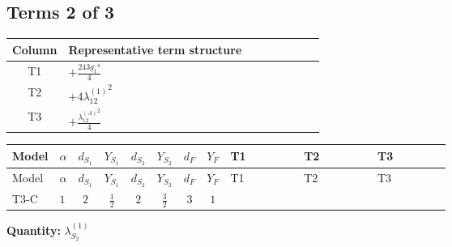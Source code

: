 \documentclass[8pt]{article}
\begin{document}
\begin{landscape}
\subsection*{Terms 2 of 3}
\begin{center}
\begin{tabular}{@{}c >{\raggedright\arraybackslash}p{0.82\linewidth}@{}}
\toprule
Column & Representative term structure \\
\midrule
T1 & \(\displaystyle +\frac{243 {g_1}^4}{4}\) \\
\midrule
T2 & \(\displaystyle +4 {\lambda_{12}^{(1)}}^2\) \\
\midrule
T3 & \(\displaystyle +\frac{{\lambda_{12}^{(A)}}^2}{4}\) \\
\midrule
\bottomrule
\end{tabular}
\end{center}
\smallskip
\tiny
\begin{longtable}{@{}llcccccc >{\raggedright\arraybackslash}p{0.21\linewidth} >{\raggedright\arraybackslash}p{0.21\linewidth} >{\raggedright\arraybackslash}p{0.21\linewidth}@{}}
\toprule
Model & $\alpha$ & $d_{S_1}$ & $Y_{S_1}$ & $d_{S_2}$ & $Y_{S_2}$ & $d_F$ & $Y_F$ & T1 & T2 & T3 \\
\midrule
\endfirsthead
\toprule
Model & $\alpha$ & $d_{S_1}$ & $Y_{S_1}$ & $d_{S_2}$ & $Y_{S_2}$ & $d_F$ & $Y_F$ & T1 & T2 & T3 \\
\midrule
\endhead
T3-C & $1$ & $2$ & $\frac{1}{2}$ & $2$ & $\frac{3}{2}$ & $3$ & $1$ & \scriptsize\adjustbox{max width=\linewidth}{$\begin{gathered} +\frac{243 {g_1}^4}{4}\end{gathered}$} & \scriptsize\adjustbox{max width=\linewidth}{$\begin{gathered} +4 {\lambda_{12}^{(1)}}^2\end{gathered}$} & \scriptsize\adjustbox{max width=\linewidth}{$\begin{gathered} +\frac{{\lambda_{12}^{(A)}}^2}{4}\end{gathered}$} \\
\midrule
\bottomrule
\end{longtable}
\clearpage
\noindent\textbf{Quantity: }$\lambda_{S_2}^{(1)}$\par\smallskip

\end{landscape}
\end{document}
